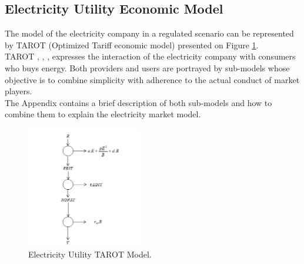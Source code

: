 \documentclass[preprint,12pt]{elsarticle}
\begin{document}
\subsection{Electricity Utility Economic Model}
\label{SS:2-2}

The model of the electricity company in a regulated scenario can be represented by TAROT (Optimized Tariff economic model) presented on Figure \ref{Fig4}. \\
TAROT \citet{Arango2010TheMarkets}, \citet{Arango2008AValue}, \citet{Arango2008OOtima}, expresses the interaction of the electricity company with consumers who buys energy. Both providers and users are portrayed by sub-models whose objective is to combine simplicity with adherence to the actual conduct of market players.\\
The Appendix contains a brief description of both sub-models and how to combine them  to explain the electricity market model.\\
\begin{figure}[h]%
\centering
\includegraphics[width = 0.45\textwidth]{Fig4.png} 
\caption{Electricity Utility TAROT Model.}
\label{Fig4}
\end{figure}
\end{document}
